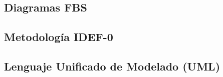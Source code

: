 \subsection{Diagramas FBS}




\subsection{Metodología IDEF-0}

\subsection{Lenguaje Unificado de Modelado (UML)}
